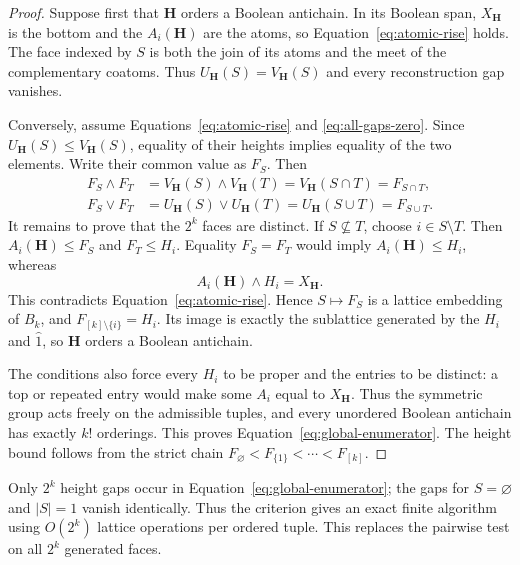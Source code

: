 \documentclass[11pt]{article}
\theoremstyle{definition}
\theoremstyle{remark}
\begin{document}
\begin{proof}
Suppose first that $\mathbf H$ orders a Boolean antichain.  In its Boolean
span, $X_{\mathbf H}$ is the bottom and the $A_i(\mathbf H)$ are the atoms,
so Equation~\eqref{eq:atomic-rise} holds.  The face indexed by $S$ is both
the join of its atoms and the meet of the complementary coatoms.  Thus
$U_{\mathbf H}(S)=V_{\mathbf H}(S)$ and every reconstruction gap vanishes.

Conversely, assume Equations~\eqref{eq:atomic-rise} and
\eqref{eq:all-gaps-zero}.  Since $U_{\mathbf H}(S)\le V_{\mathbf H}(S)$,
equality of their heights implies equality of the two elements.  Write their
common value as $F_S$.  Then
\begin{align*}
 F_S\wedge F_T
 &=V_{\mathbf H}(S)\wedge V_{\mathbf H}(T)
   =V_{\mathbf H}(S\cap T)=F_{S\cap T},\\
 F_S\vee F_T
 &=U_{\mathbf H}(S)\vee U_{\mathbf H}(T)
   =U_{\mathbf H}(S\cup T)=F_{S\cup T}.
\end{align*}
It remains to prove that the $2^k$ faces are distinct.  If
$S\nsubseteq T$, choose $i\in S\setminus T$.  Then
$A_i(\mathbf H)\le F_S$ and $F_T\le H_i$.  Equality $F_S=F_T$ would imply
$A_i(\mathbf H)\le H_i$, whereas
\[
 A_i(\mathbf H)\wedge H_i=X_{\mathbf H}.
\]
This contradicts Equation~\eqref{eq:atomic-rise}.  Hence
$S\mapsto F_S$ is a lattice embedding of $B_k$, and
$F_{[k]\setminus\{i\}}=H_i$.  Its image is exactly the sublattice generated
by the $H_i$ and $\hat1$, so $\mathbf H$ orders a Boolean antichain.

The conditions also force every $H_i$ to be proper and the entries to be
distinct: a top or repeated entry would make some $A_i$ equal to
$X_{\mathbf H}$.  Thus the symmetric group acts freely on the admissible
tuples, and every unordered Boolean antichain has exactly $k!$ orderings.
This proves Equation~\eqref{eq:global-enumerator}.
The height bound follows
from the strict chain $F_\varnothing<F_{\{1\}}<\cdots<F_{[k]}$.
\end{proof}

Only $2^k$ height gaps occur in Equation~\eqref{eq:global-enumerator}; the gaps
for $S=\varnothing$ and $|S|=1$ vanish identically.  Thus the criterion gives
an exact finite algorithm using $O(2^k)$ lattice operations per ordered
tuple.  This replaces the pairwise test on all $2^k$ generated faces.
\end{document}
